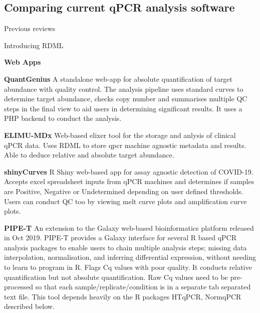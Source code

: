 \documentclass{SBCbookchapter}
\begin{document}
\subsection{Comparing current qPCR analysis software}

Previous reviews \cite{Rodiger2015, Pabinger2014}

Introducing RDML \cite{Rodiger2017}



\textbf{Web Apps}

\textbf{QuantGenius} A standalone web-app for absolute quantification of target abundance with quality control. The analysis pipeline uses standard curves to determine target abundance, checks copy number and summarises multiple QC steps in the final view to aid users in determining significant results. It uses a PHP backend to conduct the analysis.   \cite{Baebler2017}

\textbf{ELIMU-MDx} Web-based elixer tool for the storage and anlysis of clinical qPCR data. Uses RDML to store qpcr machine agnostic metadata and results. Able to deduce relative and absolute target abundance.  \cite{Krahenbuhl2019}

\textbf{shinyCurves} R Shiny web-based app for assay agnostic detection of COVID-19. Accepts excel spreadsheet inputs from qPCR machines and determines if samples are Positive, Negative or Undetermined depending on user defined thresholds. Users can conduct QC too by viewing melt curve plots and amplification curve plots. \cite{OlaecheaLazaro2021}

\textbf{PIPE-T} An extension to the Galaxy web-based bioinformatics platform released in Oct 2019. PIPE-T provides a Galaxy interface for several R based qPCR analysis packages to enable users to chain multiple analysis steps; missing data interpolation, normalisation, and inferring differential expression, without needing to learn to program in R. Flags Cq values with poor quality. It conducts relative quantification but not absolute quantification. Raw Cq values need to be pre-processed so that each sample/replicate/condition is in a separate tab separated text file.  This tool depends heavily on the R packages HTqPCR, NormqPCR described below. \cite{Zanardi2019}
\end{document}
